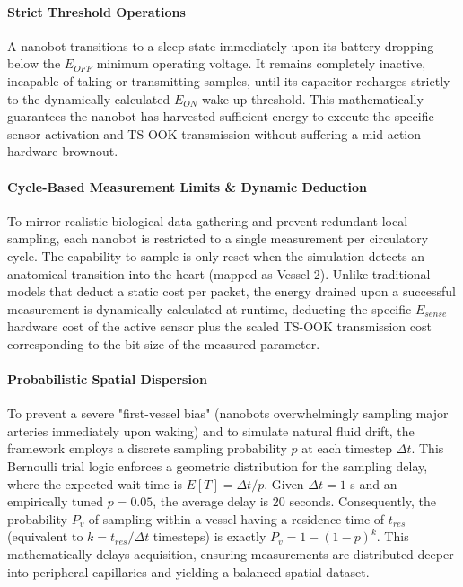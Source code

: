 \documentclass[sigconf]{acmart}
\begin{document}
\paragraph{Strict Threshold Operations} A nanobot transitions to a sleep state immediately upon its battery dropping below the $E_{OFF}$ minimum operating voltage. It remains completely inactive, incapable of taking or transmitting samples, until its capacitor recharges strictly to the dynamically calculated $E_{ON}$ wake-up threshold. This mathematically guarantees the nanobot has harvested sufficient energy to execute the specific sensor activation and TS-OOK transmission without suffering a mid-action hardware brownout.

\paragraph{Cycle-Based Measurement Limits \& Dynamic Deduction} To mirror realistic biological data gathering and prevent redundant local sampling, each nanobot is restricted to a single measurement per circulatory cycle. The capability to sample is only reset when the simulation detects an anatomical transition into the heart (mapped as Vessel 2). Unlike traditional models that deduct a static cost per packet, the energy drained upon a successful measurement is dynamically calculated at runtime, deducting the specific $E_{sense}$ hardware cost of the active sensor plus the scaled TS-OOK transmission cost corresponding to the bit-size of the measured parameter.

\paragraph{Probabilistic Spatial Dispersion} To prevent a severe "first-vessel bias" (nanobots overwhelmingly sampling major arteries immediately upon waking) and to simulate natural fluid drift, the framework employs a discrete sampling probability $p$ at each timestep $\Delta t$. This Bernoulli trial logic enforces a geometric distribution for the sampling delay, where the expected wait time is $E[T] = \Delta t / p$. Given $\Delta t = 1$ s and an empirically tuned $p = 0.05$, the average delay is 20 seconds. Consequently, the probability $P_{v}$ of sampling within a vessel having a residence time of $t_{res}$ (equivalent to $k = t_{res} / \Delta t$ timesteps) is exactly $P_{v} = 1 - (1 - p)^k$. This mathematically delays acquisition, ensuring measurements are distributed deeper into peripheral capillaries and yielding a balanced spatial dataset.
\end{document}
